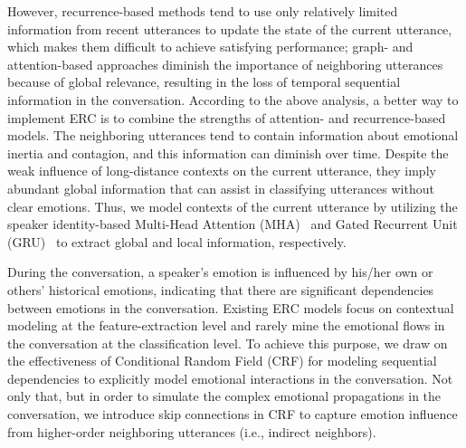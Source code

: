 \documentclass{SCIS2019}
\begin{document}
However, recurrence-based methods tend to use only relatively limited information from recent utterances to update the state of the current utterance, which makes them difficult to achieve satisfying performance; graph- and attention-based approaches diminish the importance of neighboring utterances because of global relevance, resulting in the loss of temporal sequential information in the conversation. According to the above analysis, a better way to implement ERC is to combine the strengths of attention- and recurrence-based models. The neighboring utterances tend to contain information about emotional inertia and contagion, and this information can diminish over time. Despite the weak influence of long-distance contexts on the current utterance, they imply abundant global information that can assist in classifying utterances without clear emotions. Thus, we model contexts of the current utterance by utilizing the speaker identity-based Multi-Head Attention (MHA)~\cite{vaswani2017attention} and Gated Recurrent Unit (GRU)~\cite{chung2014empirical} to extract global and local information, respectively.

During the conversation, a speaker's emotion is influenced by his/her own or others' historical emotions, indicating that there are significant dependencies between emotions in the conversation. Existing ERC models focus on contextual modeling at the feature-extraction level and rarely mine the emotional flows in the conversation at the classification level. To achieve this purpose, we draw on the effectiveness of Conditional Random Field (CRF) for modeling sequential dependencies to explicitly model emotional interactions in the conversation. Not only that, but in order to simulate the complex emotional propagations in the conversation, we introduce skip connections in CRF to capture emotion influence from higher-order neighboring utterances (i.e., indirect neighbors).
\end{document}

